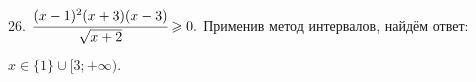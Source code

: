 26. $\cfrac{(x-1)^2(x+3)(x-3)}{\sqrt{x+2}}\geqslant0.$ Применив метод интервалов, найдём ответ:
\begin{figure}[ht!]
\end{figure}
$x\in\{1\}\cup[3;+\infty).$\newpage\noindent
